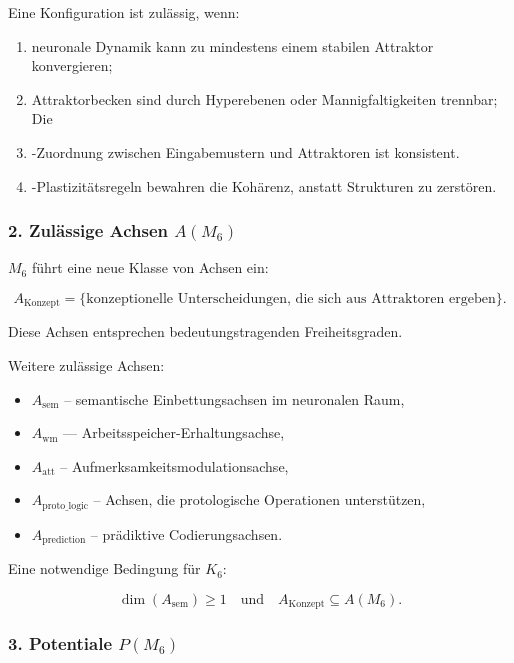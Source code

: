 Eine Konfiguration ist zulässig, wenn:

\begin{enumerate}
    \item neuronale Dynamik kann zu mindestens einem stabilen Attraktor konvergieren;
    \item Attraktorbecken sind durch Hyperebenen oder Mannigfaltigkeiten trennbar;
    Die \item-Zuordnung zwischen Eingabemustern und Attraktoren ist konsistent.
    \item-Plastizitätsregeln bewahren die Kohärenz, anstatt Strukturen zu zerstören.
\end{enumerate}

\subsubsection*{2. Zulässige Achsen \texorpdfstring{$A(M_6)$}{A(M_6)}}

$M_6$ führt eine neue Klasse von Achsen ein:

\[
A_{\mathrm{Konzept}} = \{ \text{konzeptionelle Unterscheidungen, die sich aus Attraktoren ergeben} \}.
\]

Diese Achsen entsprechen bedeutungstragenden Freiheitsgraden.

Weitere zulässige Achsen:

\begin{itemize}
    \item $A_{\mathrm{sem}}$ – semantische Einbettungsachsen im neuronalen Raum,
    \item $A_{\mathrm{wm}}$ — Arbeitsspeicher-Erhaltungsachse,
    \item $A_{\mathrm{att}}$ – Aufmerksamkeitsmodulationsachse,
    \item $A_{\mathrm{proto\_logic}}$ – Achsen, die protologische Operationen unterstützen,
    \item $A_{\mathrm{prediction}}$ – prädiktive Codierungsachsen.
\end{itemize}

Eine notwendige Bedingung für $K_6$:

\[
\dim(A_{\mathrm{sem}}) \ge 1
\quad\text{und}\quad
A_{\mathrm{Konzept}} \subseteq A(M_6).
\]

\subsubsection*{3. Potentiale \texorpdfstring{$P(M_6)$}{P(M_6)}}


